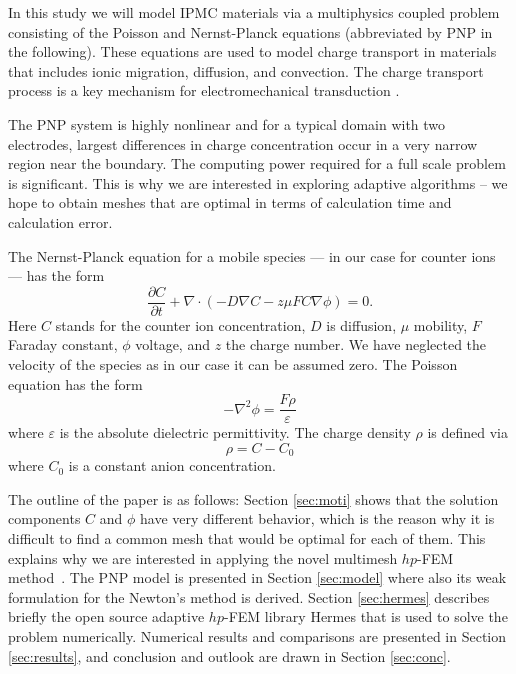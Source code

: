 \newpage

In this study we will model IPMC materials via a multiphysics coupled problem 
consisting of the Poisson and Nernst-Planck equations (abbreviated by PNP in
the following). These equations are used to model charge transport in materials 
that includes ionic migration, diffusion, and convection. The charge transport 
process is a key mechanism for electromechanical transduction 
\cite{basu1997membrane,shahinpoor2001smartmat,
nasser2002applied,newbury2003intelligent, wallmersperger2007appliedphysics,
pugal2008appliedphysics,pugal2010polymer}.

The PNP system is highly nonlinear and for a typical domain with two
electrodes, largest differences in charge concentration occur in a very narrow
region near the boundary. The computing power required for a full scale problem 
is significant. This is why we are interested in exploring adaptive algorithms
-- we hope to obtain meshes that are optimal in terms of calculation time and 
calculation error.

The Nernst-Planck equation for a mobile species ---
in our case for counter ions --- has the form
\begin{equation}
  \frac{\partial C}{\partial t}+\nabla\cdot(-D\nabla C-z\mu FC\nabla\phi)=0.
  \label{eq:nernst-planck}
\end{equation}
Here $C$ stands for the counter ion concentration, $D$ is diffusion, $\mu$ mobility,
$F$ Faraday constant, $\phi$ voltage, and $z$ the charge number. We have neglected 
the velocity of the species as in our case it can be assumed zero. 
The Poisson equation has the form
\begin{equation}
  -\nabla^2\phi=\frac{F\rho}{\varepsilon}
  \label{eq:poisson}
\end{equation}
where $\varepsilon$ is the absolute dielectric permittivity. The
charge density $\rho$ is defined via
\begin{equation}
  \rho=C-C_{0}
  \label{eq:rho}
\end{equation}
where $C_{0}$ is a constant anion concentration.

The outline of the paper is as follows: Section \ref{sec:moti} shows that 
the solution components $C$ and $\phi$ have very different behavior, which
is the reason why it is difficult to find a common mesh that would be optimal 
for each of them. This explains why we are interested in applying the novel
multimesh $hp$-FEM method~\cite{solin2010monolithic,solin2010adaptive,dubcova2010space}.
The PNP model is presented in Section \ref{sec:model} where also its weak 
formulation for the Newton's method is derived. Section \ref{sec:hermes}
describes briefly the open source adaptive $hp$-FEM library Hermes
that is used to solve the problem numerically. 
Numerical results and comparisons are presented in Section \ref{sec:results},
and conclusion and outlook are drawn in Section \ref{sec:conc}.


